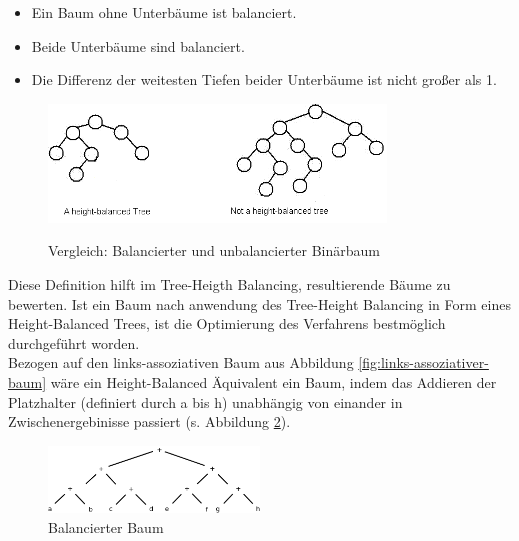 \begin{itemize} 
	\item Ein Baum ohne Unterbäume ist balanciert.
	\item Beide Unterbäume sind balanciert. 
	\item Die Differenz der weitesten Tiefen beider Unterbäume ist nicht großer als 1. 
\end{itemize}

\begin{figure}
	\begin{center}
		\includegraphics[width=0.8\textwidth]{images/balanced_tree}\\
	\end{center}
	\caption{Vergleich: Balancierter und unbalancierter Binärbaum}
	\label{fig:vgl-hbt}
\end{figure}


Diese Definition hilft im Tree-Heigth Balancing, resultierende Bäume zu bewerten. Ist ein Baum nach anwendung des Tree-Height Balancing in Form eines Height-Balanced Trees, ist die Optimierung des Verfahrens bestmöglich durchgeführt worden.\\
Bezogen auf den links-assoziativen Baum aus Abbildung \ref{fig:links-assoziativer-baum}\cite{HeBIS-309344573} wäre ein Height-Balanced Äquivalent ein Baum, indem das Addieren der Platzhalter (definiert durch a bis h) unabhängig von einander in Zwischenergebinisse passiert (s. Abbildung \ref{fig:balancierter-baum}\cite{HeBIS-309344573}).\\

\begin{figure}
	\begin{center}
		\includegraphics[width=0.5\textwidth]{images/balanced}
	\end{center}
	\caption{Balancierter Baum}
	\label{fig:balancierter-baum}
\end{figure}

